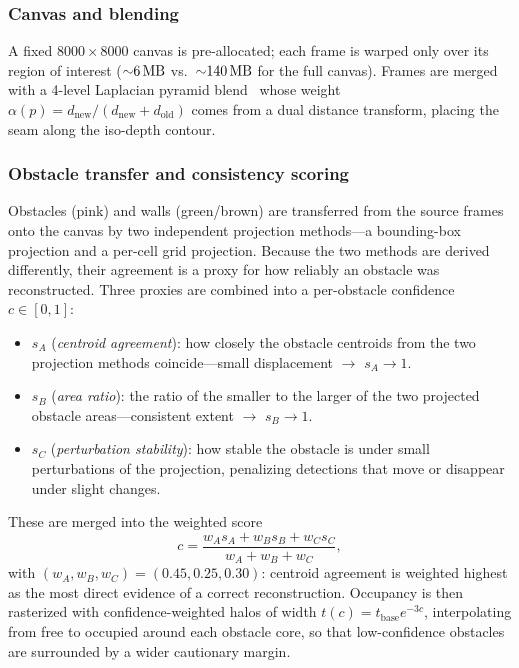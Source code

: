 \documentclass[conference]{IEEEtran}
\begin{document}
\subsubsection{Canvas and blending}
A fixed $8000\times8000$ canvas is pre-allocated; each frame is warped only over
its region of interest (${\sim}\SI{6}{\mega\byte}$ vs.\ ${\sim}\SI{140}{\mega\byte}$
for the full canvas). Frames are merged with a 4-level Laplacian pyramid blend~\cite{burt}
whose weight $\alpha(p)=d_\text{new}/(d_\text{new}+d_\text{old})$ comes from a
dual distance transform, placing the seam along the iso-depth contour.

\subsubsection{Obstacle transfer and consistency scoring}
Obstacles (pink) and walls (green/brown) are transferred from the source frames
onto the canvas by two independent projection methods---a bounding-box projection
and a per-cell grid projection. Because the two methods are derived differently,
their agreement is a proxy for how reliably an obstacle was reconstructed. Three
proxies are combined into a per-obstacle confidence $c\in[0,1]$:
\begin{itemize}
  \item $s_A$ (\emph{centroid agreement}): how closely the obstacle centroids
        from the two projection methods coincide---small displacement $\to$
        $s_A\to1$.
  \item $s_B$ (\emph{area ratio}): the ratio of the smaller to the larger of the
        two projected obstacle areas---consistent extent $\to$ $s_B\to1$.
  \item $s_C$ (\emph{perturbation stability}): how stable the obstacle is under
        small perturbations of the projection, penalizing detections that move
        or disappear under slight changes.
\end{itemize}
These are merged into the weighted score
\begin{equation}
c=\frac{w_A s_A+w_B s_B+w_C s_C}{w_A+w_B+w_C},
\end{equation}
with $(w_A,w_B,w_C)=(0.45,0.25,0.30)$: centroid agreement is weighted highest as
the most direct evidence of a correct reconstruction. Occupancy is then
rasterized with confidence-weighted halos of width $t(c)=t_\text{base}e^{-3c}$,
interpolating from free to occupied around each obstacle core, so that
low-confidence obstacles are surrounded by a wider cautionary margin.
\end{document}
